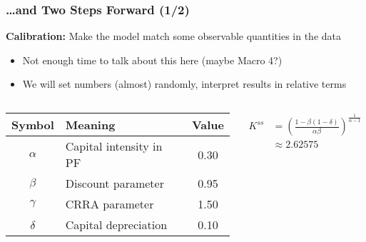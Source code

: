 \documentclass[10pt, aspectratio=1610, handout]{beamer}
\begin{document}
  \begin{frame}
    \frametitle{\dots and Two Steps Forward (1/2)}

    \textbf{Calibration:} Make the model match some observable quantities in the data

    \vfill\pause

    \begin{itemize}
      \item Not enough time to talk about this here (maybe Macro 4?)
      \item We will set numbers (almost) randomly, interpret results in relative terms
    \end{itemize}

    \vfill\pause

    \begin{columns}
      \begin{column}{0.55\textwidth}
        \begin{table}
          \centering
          \begin{tabular}{clc}
            \toprule
            Symbol   & Meaning                 & Value \\
            \midrule
            $\alpha$ & Capital intensity in PF & 0.30  \\
            $\beta$  & Discount parameter      & 0.95  \\
            $\gamma$ & CRRA parameter          & 1.50  \\
            $\delta$ & Capital depreciation    & 0.10  \\
            \bottomrule
          \end{tabular}
        \end{table}
      \end{column}
      \begin{column}{0.3\textwidth}
        \begin{align*}
          K^{ss} &= {\left( \frac{1 - \beta (1 - \delta)}{\alpha \beta} \right)}^{\frac{1}{\alpha-1}} \\
                 &\approx 2.62575
        \end{align*}
      \end{column}
    \end{columns}

  \end{frame}
\end{document}
